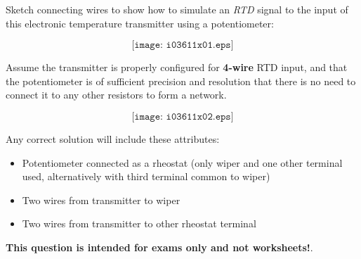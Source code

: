 

Sketch connecting wires to show how to simulate an {\it RTD} signal to the input of this electronic temperature transmitter using a potentiometer:

$$\texttt{[image: i03611x01.eps]}$$

Assume the transmitter is properly configured for {\bf 4-wire} RTD input, and that the potentiometer is of sufficient precision and resolution that there is no need to connect it to any other resistors to form a network.







$$\texttt{[image: i03611x02.eps]}$$

Any correct solution will include these attributes:

\begin{itemize}
\item{} Potentiometer connected as a rheostat (only wiper and one other terminal used, alternatively with third terminal common to wiper)
\item{} Two wires from transmitter to wiper
\item{} Two wires from transmitter to other rheostat terminal
\end{itemize}







{\bf This question is intended for exams only and not worksheets!}.



